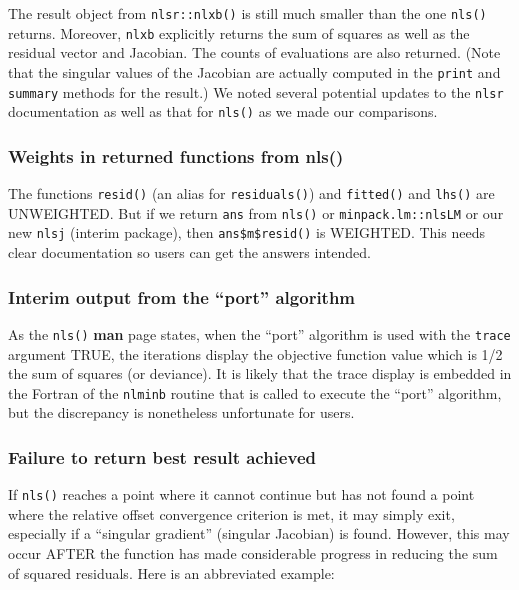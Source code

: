 \documentclass[
]{article}
\begin{document}
The result object from \texttt{nlsr::nlxb()} is still much smaller than
the one \texttt{nls()} returns. Moreover, \texttt{nlxb} explicitly
returns the sum of squares as well as the residual vector and Jacobian.
The counts of evaluations are also returned. (Note that the singular
values of the Jacobian are actually computed in the \texttt{print} and
\texttt{summary} methods for the result.) We noted several potential
updates to the \texttt{nlsr} documentation as well as that for
\texttt{nls()} as we made our comparisons.

\hypertarget{weights-in-returned-functions-from-nls}{%
\subsubsection{Weights in returned functions from
nls()}\label{weights-in-returned-functions-from-nls}}

The functions \texttt{resid()} (an alias for \texttt{residuals()}) and
\texttt{fitted()} and \texttt{lhs()} are UNWEIGHTED. But if we return
\texttt{ans} from \texttt{nls()} or \texttt{minpack.lm::nlsLM} or our
new \texttt{nlsj} (interim package), then \texttt{ans\$m\$resid()} is
WEIGHTED. This needs clear documentation so users can get the answers
intended.

\hypertarget{interim-output-from-the-port-algorithm}{%
\subsubsection{Interim output from the ``port''
algorithm}\label{interim-output-from-the-port-algorithm}}

As the \texttt{nls()} \textbf{man} page states, when the ``port''
algorithm is used with the \texttt{trace} argument TRUE, the iterations
display the objective function value which is 1/2 the sum of squares (or
deviance). It is likely that the trace display is embedded in the
Fortran of the \texttt{nlminb} routine that is called to execute the
``port'' algorithm, but the discrepancy is nonetheless unfortunate for
users.

\hypertarget{failure-to-return-best-result-achieved}{%
\subsubsection{Failure to return best result
achieved}\label{failure-to-return-best-result-achieved}}

If \texttt{nls()} reaches a point where it cannot continue but has not
found a point where the relative offset convergence criterion is met, it
may simply exit, especially if a ``singular gradient'' (singular
Jacobian) is found. However, this may occur AFTER the function has made
considerable progress in reducing the sum of squared residuals. Here is
an abbreviated example:
\end{document}
